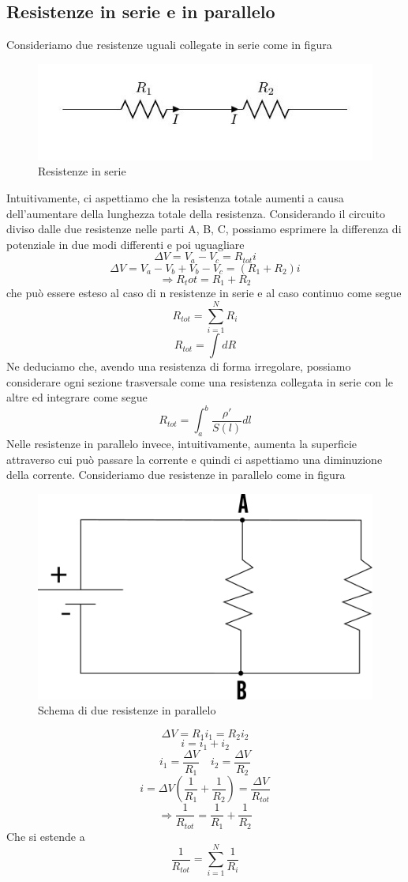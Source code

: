 \documentclass[10pt,a4paper]{article}
\begin{document}
\subsection{Resistenze in serie e in parallelo}
Consideriamo due resistenze uguali collegate in serie come in figura
\begin{figure}[h!]
	\centering
	\includegraphics[width=0.6\linewidth]{images/resistenze_serie}
	\caption{Resistenze in serie}
	\label{fig:resistenzeserie}
\end{figure}
\FloatBarrier
Intuitivamente, ci aspettiamo che la resistenza totale aumenti a causa dell'aumentare della lunghezza totale della resistenza. Considerando il circuito diviso dalle due resistenze nelle parti A, B, C, possiamo esprimere la differenza di potenziale in due modi differenti e poi uguagliare
\[\Delta V = V_a - V_c = R_{tot}i\]
\[\Delta V = V_a -V_b + V_b- V_c = (R_1 + R_2)i\]
\[\Rightarrow R_tot = R_1 + R_2\]
che può essere esteso al caso di n resistenze in serie e al caso continuo come segue
\[R_{tot} = \sum_{i=1}^N R_i \]
\[R_{tot} = \int dR\]
Ne deduciamo che, avendo una resistenza di forma irregolare, possiamo considerare ogni sezione trasversale come una resistenza collegata in serie con le altre ed integrare come segue
\[R_{tot}= \int_{a}^{b}\frac{\rho'}{S(l)}dl\]
Nelle resistenze in parallelo invece, intuitivamente, aumenta la superficie attraverso cui può passare la corrente e quindi ci aspettiamo una diminuzione della corrente. Consideriamo due resistenze in parallelo come in figura
\begin{figure}[h!]
	\centering
	\includegraphics[width=0.5\linewidth]{images/resistenze_parallelo}
	\caption{Schema di due resistenze in parallelo}
	\label{fig:resistenzeparallelo}
\end{figure}
\FloatBarrier
\[\Delta V = R_1i_1= R_2i_2\]
\[i = i_1+i_2\]
\[i_1 = \frac{\Delta V}{R_1}\quad i_2 = \frac{\Delta V}{R_2} \]
\[ i = \Delta V \left(\frac{1}{R_1}+\frac{1}{R_2}\right)= \frac{\Delta V}{R_{tot}} \]
\[\Rightarrow \frac{1}{R_{tot}} = \frac{1}{R_1}+\frac{1}{R_2} \]
Che si estende a 
\[\frac{1}{R_{tot}}= \sum_{i = 1}^N\frac{1}{R_i}\]
\end{document}
